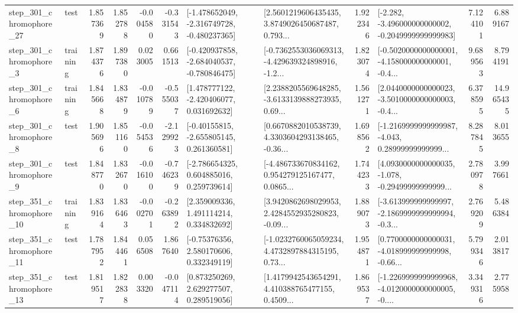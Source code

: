 \begin{tabular}{llrrrrllrlrr}
  step\_301\_chromophore\_27 &      test &      1.857369 &    1.852788 &     -0.004580 & -0.331543 &  [-1.478652049, -2.316749728, -0.480237365] &  [2.5601219606435435, 3.8749026450687487, 0.793... &       1.922346 &  [-2.282, -3.496000000000002, -0.2049999999999983] &            7.124101 &          6.889167 \\
   step\_301\_chromophore\_3 &  training &      1.874376 &    1.897380 &      0.023005 &  0.661513 &  [-0.420937858, -2.684040537, -0.780846475] &  [-0.7362553036069313, -4.429639324898916, -1.2... &       1.823074 &  [-0.5020000000000001, -4.158000000000001, -0.4... &            9.689563 &          8.794191 \\
   step\_301\_chromophore\_6 &  training &      1.845668 &    1.834879 &     -0.010789 & -0.555037 &    [1.478777122, -2.420406077, 0.031692632] &  [2.2388205569648285, -3.6133139888273935, 0.69... &       1.561271 &  [2.0440000000000023, -3.5010000000000003, -0.4... &            6.378595 &         14.965435 \\
   step\_301\_chromophore\_8 &      test &      1.905696 &    1.851160 &     -0.054536 & -2.129923 &    [-0.40155815, -2.655805145, 0.261360581] &  [0.6670882010538739, 4.3303604293138465, -0.36... &       1.698562 &  [-1.2169999999999987, -4.043, 0.28999999999999... &            8.287845 &          8.013655 \\
   step\_301\_chromophore\_9 &      test &      1.848770 &    1.832670 &     -0.016100 & -0.746239 &    [-2.786654325, 0.604885016, 0.259739614] &  [-4.486733670834162, 0.954279125167477, 0.0865... &       1.744233 &  [4.0930000000000035, -1.078, -0.29499999999999... &            2.780978 &          3.997661 \\
  step\_351\_chromophore\_10 &  training &      1.839164 &    1.836463 &     -0.002701 & -0.263892 &     [2.359009336, 1.491114214, 0.334832692] &  [3.9420862698029953, 2.4284552935280823, -0.09... &       1.889073 &  [-3.613999999999997, -2.1869999999999994, -0.3... &            2.769209 &          5.486384 \\
  step\_351\_chromophore\_11 &      test &      1.787952 &    1.844461 &      0.056508 &  1.867640 &     [-0.75376356, 2.580170606, 0.332349119] &  [-1.0232760065059234, 4.4732897884315195, 0.73... &       1.954871 &  [0.7700000000000031, -4.018999999999998, -0.66... &            5.799346 &          2.013817 \\
  step\_351\_chromophore\_13 &      test &      1.819517 &    1.822838 &      0.003320 & -0.047114 &     [0.873250269, 2.629277507, 0.289519056] &  [1.4179942543654291, 4.410388765477155, 0.4509... &       1.869537 &  [-1.2269999999999968, -4.0120000000000005, -0.... &            3.349316 &          2.775958 \\

\end{tabular}
